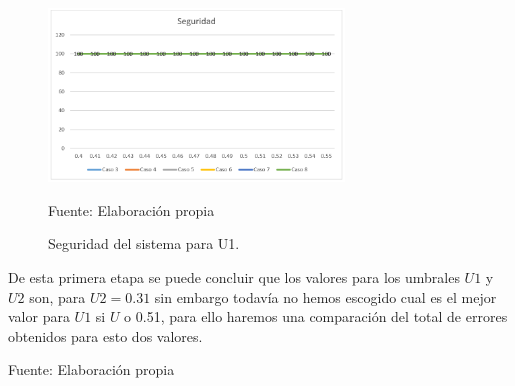 \begin{figure}[H]
\begin{center}
\includegraphics[width=0.7\textwidth]{Imagenes/Cap4/image004}
\end{center}
\begin{center}
\vskip -0.5cm
\caption{\small{Seguridad del sistema para U1.}}
\label{fig:figura4.4}
{\small{Fuente: Elaboración propia}}
\end{center}
\end{figure}

De esta primera etapa se puede concluir que los valores para los umbrales $U1$ y $U2$ son, para $U2 = 0.31$ sin embargo todavía no hemos escogido cual es el mejor valor para $U1$ si $U$ o 0.51, para ello haremos una comparación del total de errores obtenidos para esto dos valores.

\begin{center}
\begin{table}[H]
\centering
\caption{\small{Comparación de numero de errores entre U1 = U y U1 = 0.51.}}
\label{table:tabla4.17}
\vskip 0.2cm
\begin{center}
\vskip 0.2cm
{\small{Fuente: Elaboración propia}}
\end{center}
\end{table}
\end{center}

